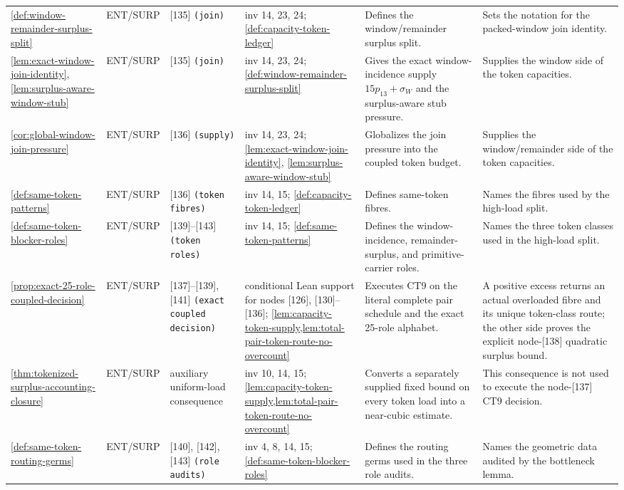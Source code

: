 \documentclass[11pt]{article}
\begin{document}
{\begin{longtable}{L{0.10\textwidth} C{0.045\textwidth} L{0.13\textwidth} L{0.135\textwidth} L{0.28\textwidth} L{0.20\textwidth}}
\cref{def:window-remainder-surplus-split} & ENT\slash SURP & [135] \texttt{(join)} & inv 14, 23, 24; \cref{def:capacity-token-ledger} & Defines the window/remainder surplus split. & Sets the notation for the packed-window join identity. \\
\cref{lem:exact-window-join-identity}, \cref{lem:surplus-aware-window-stub} & ENT\slash SURP & [135] \texttt{(join)} & inv 14, 23, 24; \cref{def:window-remainder-surplus-split} & Gives the exact window-incidence supply \(15p_{13}+\sigma_W\) and the surplus-aware stub pressure. & Supplies the window side of the token capacities. \\
\cref{cor:global-window-join-pressure} & ENT\slash SURP & [136] \texttt{(supply)} & inv 14, 23, 24; \cref{lem:exact-window-join-identity}, \cref{lem:surplus-aware-window-stub} & Globalizes the join pressure into the coupled token budget. & Supplies the window/remainder side of the token capacities. \\
\cref{def:same-token-patterns} & ENT\slash SURP & [136] \texttt{(token fibres)} & inv 14, 15; \cref{def:capacity-token-ledger} & Defines same-token fibres. & Names the fibres used by the high-load split. \\
\cref{def:same-token-blocker-roles} & ENT\slash SURP & [139]--[143] \texttt{(token roles)} & inv 14, 15; \cref{def:same-token-patterns} & Defines the window-incidence, remainder-surplus, and primitive-carrier roles. & Names the three token classes used in the high-load split. \\
\cref{prop:exact-25-role-coupled-decision} & ENT\slash SURP & [137]--[139], [141] \texttt{(exact coupled decision)} & conditional Lean support for nodes [126], [130]--[136]; \cref{lem:capacity-token-supply,lem:total-pair-token-route-no-overcount} & Executes CT9 on the literal complete pair schedule and the exact 25-role alphabet. & A positive excess returns an actual overloaded fibre and its unique token-class route; the other side proves the explicit node-[138] quadratic surplus bound. \\
\cref{thm:tokenized-surplus-accounting-closure} & ENT\slash SURP & auxiliary uniform-load consequence & inv 10, 14, 15; \cref{lem:capacity-token-supply,lem:total-pair-token-route-no-overcount} & Converts a separately supplied fixed bound on every token load into a near-cubic estimate. & This consequence is not used to execute the node-[137] CT9 decision. \\
\cref{def:same-token-routing-germs} & ENT\slash SURP & [140], [142], [143] \texttt{(role audits)} & inv 4, 8, 14, 15; \cref{def:same-token-blocker-roles} & Defines the routing germs used in the three role audits. & Names the geometric data audited by the bottleneck lemma. \\

\end{longtable}}
\end{document}
